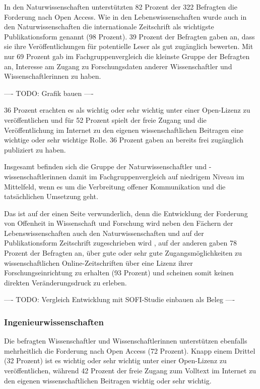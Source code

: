 In den Naturwissenschaften unterstützten 82 Prozent der 322 Befragten die Forderung nach Open Access. Wie in den Lebenswissenschaften wurde auch in den Naturwissenschaften die internationale Zeitschrift als wichtigste Publikationsform genannt (98 Prozent). 39 Prozent der Befragten gaben an, dass sie ihre Veröffentlichungen für potentielle Leser als gut zugänglich bewerten. Mit nur 69 Prozent gab im Fachgruppenvergleich die kleinste Gruppe der Befragten an, Interesse am Zugang zu Forschungsdaten anderer Wissenschaftler und Wissenschaftlerinnen zu haben.

---- TODO: Grafik bauen  ----

36 Prozent erachten es als wichtig oder sehr wichtig unter einer Open-Lizenz zu veröffentlichen und für 52 Prozent spielt der freie Zugang und die Veröffentlichung im Internet zu den eigenen wissenschaftlichen Beitragen eine wichtige oder sehr wichtige Rolle. 36 Prozent gaben an bereits frei zugänglich publiziert zu haben.

Insgesamt befinden sich die Gruppe der Naturwissenschaftler und -wissenschaftlerinnen damit im Fachgruppenvergleich auf niedrigem Niveau im Mittelfeld, wenn es um die Verbreitung offener Kommunikation und die tatsächlichen Umsetzung geht.

Das ist auf der einen Seite verwunderlich, denn die Entwicklung der Forderung von Offenheit in Wissenschaft und Forschung wird neben den Fächern der Lebenswissenschaften auch den Naturwissenschaften und auf der Publikationsform Zeitschrift zugeschrieben wird \cite{suchen}, auf der anderen gaben 78 Prozent der Befragten an, über gute oder sehr gute Zugangsmöglichkeiten zu wissenschaftlichen Online-Zeitschriften über eine Lizenz ihrer Forschungseinrichtung zu erhalten (93 Prozent) und scheinen somit keinen direkten Veränderungsdruck zu erleben.

---- TODO: Vergleich Entwicklung mit SOFI-Studie einbauen als Beleg ----

\subsubsection{Ingenieurwissenschaften}

Die befragten Wissenschaftler und Wissenschaftlerinnen unterstützen ebenfalls mehrheitlich die Forderung nach Open Access (72 Prozent). Knapp einem Drittel (32 Prozent) ist es wichtig oder sehr wichtig unter einer Open-Lizenz zu veröffentlichen, während 42 Prozent der freie Zugang zum Volltext im Internet zu den eigenen wissenschaftlichen Beitragen wichtig oder sehr wichtig.

